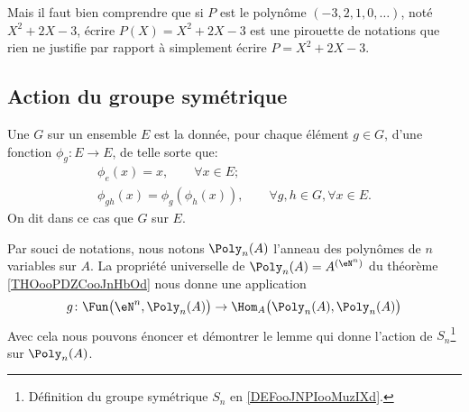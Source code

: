 Mais il faut bien comprendre que si \( P\) est le polynôme \( (-3,2,1,0,\ldots)\), noté \( X^2+2X-3\), écrire \( P(X)=X^2+2X-3\) est une pirouette de notations que rien ne justifie par rapport à simplement écrire \( P=X^2+2X-3\).



\subsection{Action du groupe symétrique}

\begin{definition}  \label{DefActionGroupe}
    Une  \( G\) sur un ensemble \( E\) est la donnée, pour chaque élément \( g \in G\), d'une fonction \(\phi_g : E \to E \), de telle sorte que:
    \begin{gather*}
        \phi_{e}(x) = x, \hspace{2em} \forall x \in E;\\
        \phi_{gh}(x) = \phi_g (\phi_h (x)),  \hspace{2em} \forall g,h \in G, \forall x \in E.
     \end{gather*}
     On dit dans ce cas que \( G \)  sur \( E \).
\end{definition}

Par souci de notations, nous notons \( \Poly_n(A)\) l'anneau des polynômes de \( n\) variables sur \( A\). La propriété universelle de \( \Poly_n(A)=A^{(\eN^n)}\) du théorème \ref{THOooPDZCooJnHbOd} nous donne une application
\begin{equation}
    g\colon \Fun\big(\eN^n,\Poly_n(A)\big)\to \Hom_A\big( \Poly_n(A),\Poly_n(A) \big)
\end{equation}
Avec cela nous pouvons énoncer et démontrer le lemme qui donne l'action de \( S_n\)\footnote{Définition du groupe symétrique \( S_n\) en \ref{DEFooJNPIooMuzIXd}.} sur \( \Poly_n(A)\).

